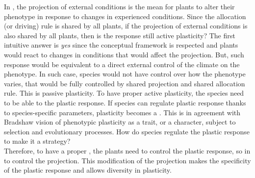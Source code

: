 In \model, the projection of external conditions is the mean for plants to alter their phenotype in response to changes in experienced conditions. Since the allocation (or driving) rule is shared by all plants, if the projection of external conditions is also shared by all plants, then is the response still active plasticity? The first intuitive answer is \textit{yes} since the conceptual framework is respected and plants would react to changes in conditions that would affect the projection. But, such response would be equivalent to a direct external control of the climate on the phenotype. In such case, species would not have control over how the phenotype varies, that would be fully controlled by shared projection and shared allocation rule. This is passive plasticity. To have proper active plasticity, the species need to be able to  the plastic response. If species can regulate plastic response thanks to species-specific parameters, plasticity becomes a . This is in agreement with Bradshaw vision of phenotypic plasticity as a trait, or a character, subject to selection and evolutionary processes\parencite{bradshaw_evolutionary_1965, bradshaw_unravelling_2006}. How do species regulate the plastic response to make it a strategy?\\

Therefore, to have a proper , the plants need to control the plastic response, so in \model to control the projection. This modification of the projection makes the specificity of the plastic response and allows diversity in plasticity. 



